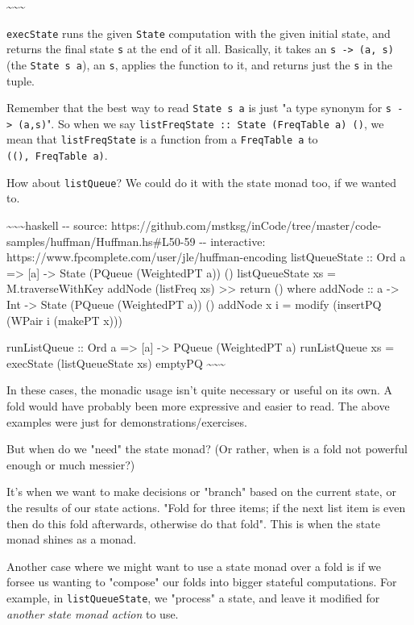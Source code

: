 \documentclass[]{article}
\begin{document}
\textasciitilde{}\textasciitilde{}\textasciitilde{}

\texttt{execState} runs the given \texttt{State} computation with the given
initial state, and returns the final state \texttt{s} at the end of it all.
Basically, it takes an \texttt{s\ -\textgreater{}\ (a,\ s)} (the
\texttt{State\ s\ a}), an \texttt{s}, applies the function to it, and returns
just the \texttt{s} in the tuple.

Remember that the best way to read \texttt{State\ s\ a} is just "a type synonym
for \texttt{s\ -\textgreater{}\ (a,s)}". So when we say
\texttt{listFreqState\ ::\ State\ (FreqTable\ a)\ ()}, we mean that
\texttt{listFreqState} is a function from a \texttt{FreqTable\ a} to
\texttt{((),\ FreqTable\ a)}.

How about \texttt{listQueue}? We could do it with the state monad too, if we
wanted to.

\textasciitilde{}\textasciitilde{}\textasciitilde{}haskell -\/- source:
https://github.com/mstksg/inCode/tree/master/code-samples/huffman/Huffman.hs\#L50-59
-\/- interactive: https://www.fpcomplete.com/user/jle/huffman-encoding
listQueueState :: Ord a =\textgreater{} {[}a{]} -\textgreater{} State (PQueue
(WeightedPT a)) () listQueueState xs = M.traverseWithKey addNode (listFreq xs)
\textgreater{}\textgreater{} return () where addNode :: a -\textgreater{} Int
-\textgreater{} State (PQueue (WeightedPT a)) () addNode x i = modify (insertPQ
(WPair i (makePT x)))

runListQueue :: Ord a =\textgreater{} {[}a{]} -\textgreater{} PQueue (WeightedPT
a) runListQueue xs = execState (listQueueState xs) emptyPQ
\textasciitilde{}\textasciitilde{}\textasciitilde{}

In these cases, the monadic usage isn't quite necessary or useful on its own. A
fold would have probably been more expressive and easier to read. The above
examples were just for demonstrations/exercises.

But when do we "need" the state monad? (Or rather, when is a fold not powerful
enough or much messier?)

It's when we want to make decisions or "branch" based on the current state, or
the results of our state actions. "Fold for three items; if the next list item
is even then do this fold afterwards, otherwise do that fold". This is when the
state monad shines as a monad.

Another case where we might want to use a state monad over a fold is if we
forsee us wanting to "compose" our folds into bigger stateful computations. For
example, in \texttt{listQueueState}, we "process" a state, and leave it modified
for \emph{another state monad action} to use.
\end{document}
